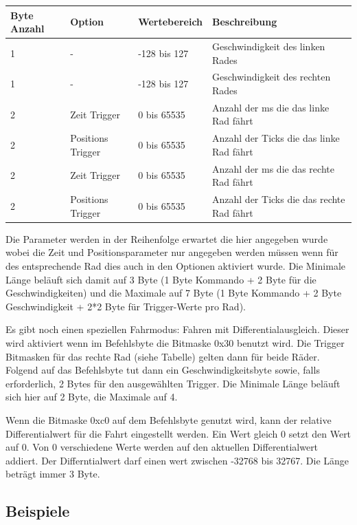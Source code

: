\documentclass[a4paper]{article}
\begin{document}
	\begin{tabularx}{\linewidth}{|l|l|l|X|}
		\hline
		\textbf{Byte Anzahl} & \textbf{Option} & \textbf{Wertebereich} & \textbf{Beschreibung} \\
		\hline
		\hline
		1					 & - & -128 bis 127 & Geschwindigkeit des linken Rades \\
		\hline
		1					 & - & -128 bis 127 & Geschwindigkeit des rechten Rades\\
		\hline
		2					 & Zeit Trigger & 0 bis 65535 &  Anzahl der ms die das linke Rad fährt\\
		\hline
		2					 & Positions Trigger & 0 bis 65535 &  Anzahl der Ticks die das linke Rad fährt\\
		\hline
		2					 & Zeit Trigger & 0 bis 65535 &  Anzahl der ms die das rechte Rad fährt\\
		\hline
		2					 & Positions Trigger & 0 bis 65535 &  Anzahl der Ticks die das rechte Rad fährt\\
		\hline
	\end{tabularx}
	
	Die Parameter werden in der Reihenfolge erwartet die hier angegeben wurde wobei die Zeit und Positionsparameter nur
	angegeben werden müssen wenn für des entsprechende Rad dies auch in den Optionen aktiviert wurde.
	Die Minimale Länge beläuft sich damit auf 3 Byte (1 Byte Kommando + 2 Byte für die Geschwindigkeiten) und die
	Maximale auf 7 Byte (1 Byte Kommando + 2 Byte Geschwindigkeit + 2*2 Byte für Trigger-Werte pro Rad).

	Es gibt noch einen speziellen Fahrmodus: Fahren mit Differentialausgleich. Dieser wird aktiviert wenn im Befehlsbyte
	die Bitmaske 0x30 benutzt wird. Die Trigger Bitmasken für das rechte Rad (siehe Tabelle) gelten dann für beide Räder.
	Folgend auf das Befehlsbyte tut dann ein Geschwindigkeitsbyte sowie, falls erforderlich, 2 Bytes für den ausgewählten
	Trigger. Die Minimale Länge beläuft sich hier auf 2 Byte, die Maximale auf 4.

	Wenn die Bitmaske 0xc0 auf dem Befehlsbyte genutzt wird, kann der relative Differentialwert für die Fahrt eingestellt
	werden. Ein Wert gleich 0 setzt den Wert auf 0. Von 0 verschiedene Werte werden auf den aktuellen Differentialwert
	addiert. Der Differntialwert darf einen wert zwischen -32768 bis 32767. Die Länge beträgt immer 3 Byte.

	\subsection{Beispiele}
\end{document}
